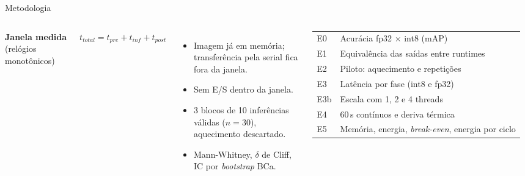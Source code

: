 \documentclass[aspectratio=169,11pt]{beamer}
\begin{document}
\begin{frame}{Metodologia}
\begin{columns}[T]
\textbf{Janela medida} (relógios monotônicos)\\[2pt]
\centerline{$t_{total}=t_{pre}+t_{inf}+t_{post}$}
\vspace{0.15cm}
\begin{itemize}\small
\item Imagem já em memória; transferência pela serial fica fora da janela.
\item Sem E/S dentro da janela.
\item 3 blocos de 10 inferências válidas ($n=30$), aquecimento descartado.
\item Mann-Whitney, $\delta$ de Cliff, IC por \emph{bootstrap} BCa.
\end{itemize}
\small
\begin{tabularx}{\linewidth}{lL}\toprule
E0 & Acurácia fp32 $\times$ int8 (mAP)\\
E1 & Equivalência das saídas entre runtimes\\
E2 & Piloto: aquecimento e repetições\\
E3 & Latência por fase (int8 e fp32)\\
E3b & Escala com 1, 2 e 4 threads\\
E4 & 60\,s contínuos e deriva térmica\\
E5 & Memória, energia, \emph{break-even}, energia por ciclo\\\bottomrule
\end{tabularx}
\end{columns}
\end{frame}
\end{document}
